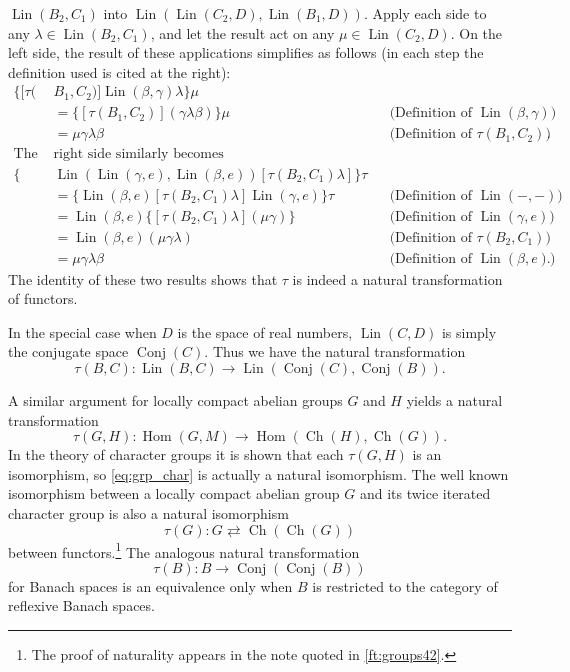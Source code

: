 \documentclass[11pt,a4paper]{report}
\DeclareMathOperator{\hm}{Hom}
\DeclareMathOperator{\lin}{Lin}
\DeclareMathOperator{\dual}{Conj}
\DeclareMathOperator{\ch}{Ch}
\begin{document}
$\lin(B_2,C_1)$ into $\lin(\lin(C_2,D),\lin(B_1,D))$. Apply each side to any $\lambda\in\lin(B_2,C_1)$, and
let the result act on any $\mu\in\lin(C_2,D)$. On the left side, the result of these applications simplifies
as follows (in each step the definition used is cited at the right):
\begin{align*}
	\{[\tau(& B_1, C_2)]\lin(\beta,\gamma)\lambda\}\mu &&\\ 
	&= \{[\tau(B_1,C_2)](\gamma\lambda\beta)\}\mu &&\text{(Definition of $\lin(\beta,\gamma))$}\\
	&=\mu\gamma\lambda\beta &&\text{(Definition of $\tau(B_1,C_2))$}.\\
	\text{The } & \text{right side similarly becomes}\\
	\{&\lin(\lin(\gamma,e),\lin(\beta,e))[\tau(B_2,C_1)\lambda]\}\tau &&\\
	&= \{\lin(\beta,e)[\tau(B_2,C_1)\lambda]\lin(\gamma,e)\}\tau &&\text{(Definition of $\lin(-,-))$}\\
	&= \lin(\beta,e)\{[\tau(B_2,C_1)\lambda](\mu\gamma)\} &&\text{(Definition of $\lin(\gamma,e))$}\\
	&= \lin(\beta,e)(\mu\gamma\lambda) &&\text{(Definition of $\tau(B_2,C_1))$}\\
	&=\mu\gamma\lambda\beta &&\text{(Definition of $\lin(\beta,e)$)}.
\end{align*}
The identity of these two results shows that $\tau$ is indeed a natural transformation of functors.

In the special case when $D$ is the space of real numbers, $\lin(C,D)$ is simply the conjugate space
$\dual(C)$. Thus we have the natural transformation
\begin{equation}\label{eq:ban_dual}
	\tau(B,C):\lin(B,C)\rightarrow\lin(\dual(C),\dual(B)).
\end{equation}

A similar argument for locally compact abelian groups $G$ and $H$ yields a natural transformation
\begin{equation}\label{eq:grp_char}
	\tau(G,H):\hm(G,M)\rightarrow\hm(\ch(H),\ch(G)).
\end{equation}
In the theory of character groups it is shown that each $\tau(G,H)$ is an isomorphism, so \cref{eq:grp_char}
is actually a natural isomorphism. The well known isomorphism between a locally compact abelian group $G$ and
its twice iterated character group is also a natural isomorphism
\begin{equation*}
	\tau(G):G\rightleftarrows\ch(\ch(G))
\end{equation*}
between functors.\footnote{The proof of naturality appears in the note quoted in \cref{ft:groups42}.}
The analogous natural transformation
\begin{equation*}
	\tau(B):B\rightarrow\dual(\dual(B))
\end{equation*}
for Banach spaces is an equivalence only when $B$ is restricted to the category of reflexive Banach spaces.
\end{document}
